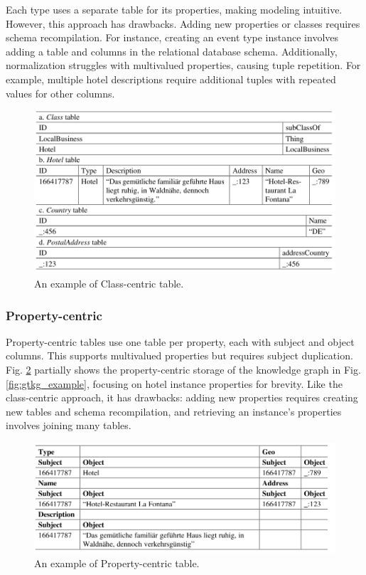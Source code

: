 \documentclass[12pt]{article}
\begin{document}
Each type uses a separate table for its properties, making modeling intuitive. However, this approach has drawbacks. Adding new properties or classes requires schema recompilation. For instance, creating an event type instance involves adding a table and columns in the relational database schema. Additionally, normalization struggles with multivalued properties, causing tuple repetition. For example, multiple hotel descriptions require additional tuples with repeated values for other columns.
\begin{figure}
    \includegraphics[width=\linewidth]{imgs/Class-centric.jpeg}
    \caption{An example of Class-centric table.}
    \label{fig:Class-centric-example}
\end{figure}
\subsubsection{Property-centric}
Property-centric tables use one table per property, each with subject and object columns. This supports multivalued properties but requires subject duplication. Fig. \ref{fig:Property-centric-example} partially shows the property-centric storage of the knowledge graph in Fig. \ref{fig:gtkg_example}, focusing on hotel instance properties for brevity. Like the class-centric approach, it has drawbacks: adding new properties requires creating new tables and schema recompilation, and retrieving an instance’s properties involves joining many tables.
\begin{figure}
    \includegraphics[width=\linewidth]{imgs/Property-centric.jpeg}
    \caption{An example of Property-centric table.}
    \label{fig:Property-centric-example}
\end{figure}
\end{document}
